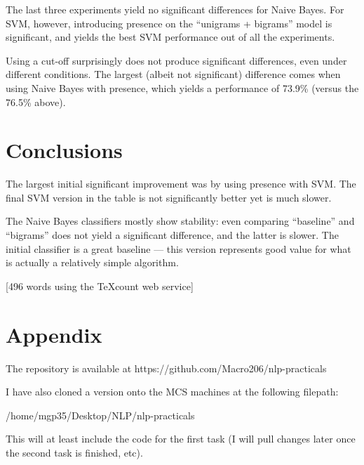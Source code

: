 \documentclass[12pt,a4paper,twoside]{article}
\begin{document}
The last three experiments yield no significant differences for Naive Bayes. For SVM, however, introducing presence on the ``unigrams + bigrams'' model is significant, and yields the best SVM performance out of all the experiments.

Using a cut-off surprisingly does not produce significant differences, even under different conditions. The largest (albeit not significant) difference comes when using Naive Bayes with presence, which yields a performance of 73.9\% (versus the 76.5\% above).


\section{Conclusions}

The largest initial significant improvement was by using presence with SVM. The final SVM version in the table is not significantly better yet is much slower.

The Naive Bayes classifiers mostly show stability: even comparing ``baseline'' and ``bigrams'' does not yield a significant difference, and the latter is slower. The initial classifier is a great baseline --- this version represents good value for what is actually a relatively simple algorithm.

\vspace{16px}

[496 words using the TeXcount web service]


\section{Appendix}

The repository is available at https://github.com/Macro206/nlp-practicals

I have also cloned a version onto the MCS machines at the following filepath:

/home/mgp35/Desktop/NLP/nlp-practicals

This will at least include the code for the first task (I will pull changes later once the second task is finished, etc).
\end{document}
